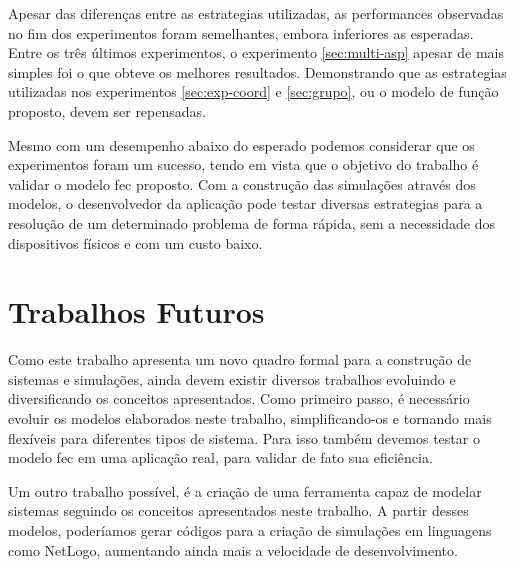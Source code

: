     Apesar das diferenças entre as estrategias utilizadas, as performances observadas no fim dos experimentos foram semelhantes, embora inferiores as esperadas. Entre os três últimos experimentos, o experimento \ref{sec:multi-asp} apesar de mais simples foi o que obteve os melhores resultados. Demonstrando que as estrategias utilizadas nos experimentos \ref{sec:exp-coord} e \ref{sec:grupo}, ou o modelo de função proposto, devem ser repensadas. 
    
    Mesmo com um desempenho abaixo do esperado podemos considerar que os experimentos foram um sucesso, tendo em vista que o objetivo do trabalho é validar o modelo \acrshort{fec} proposto. Com a construção das simulações através dos modelos, o desenvolvedor da aplicação pode testar diversas estrategias para a resolução de um determinado problema de forma rápida, sem a necessidade dos dispositivos físicos e com um custo baixo.
    
    \section{Trabalhos Futuros}
    Como este trabalho apresenta um novo quadro formal para a construção de sistemas e simulações, ainda devem existir diversos trabalhos evoluindo e diversificando os conceitos apresentados. Como primeiro passo, é necessário evoluir os modelos elaborados neste trabalho, simplificando-os e tornando mais flexíveis para diferentes tipos de sistema. Para isso também devemos testar o modelo \acrshort{fec} em uma aplicação real, para validar de fato sua eficiência. 
    
    Um outro trabalho possível, é a criação de uma ferramenta capaz de modelar sistemas seguindo os conceitos apresentados neste trabalho. A partir desses modelos, poderíamos gerar códigos para a criação de simulações em linguagens como NetLogo, aumentando ainda mais a velocidade de desenvolvimento. 
    